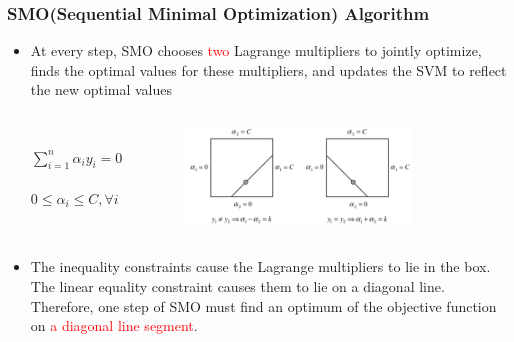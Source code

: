 \documentclass{beamer}
\begin{document}
\begin{frame}
	\frametitle{SMO(Sequential Minimal Optimization) Algorithm}	 
	\begin{itemize}
		\item At every step, SMO chooses \textcolor{red}{two} Lagrange multipliers to jointly optimize, finds the
		optimal values for these multipliers, and updates the SVM to reflect the new optimal values
		
		\begin{columns}[c] %
			
				 \\
				$\sum_{i=1}^{n}\alpha_iy_i=0$ \\
				 \\
				$0 \leq \alpha_i \leq C, \forall i$	
			
				\begin{figure}
					\includegraphics[width=0.8\textwidth]{figs/two_lagrange_opt.png}
				\end{figure}
		\end{columns}
		\item 
		The inequality constraints cause the Lagrange multipliers to lie in the box. The linear equality
		constraint causes them to lie on a diagonal line. Therefore, one step of SMO must find an
		optimum of the objective function on \textcolor{red}{a diagonal line segment}.
	\end{itemize}	
\end{frame}
\end{document}
